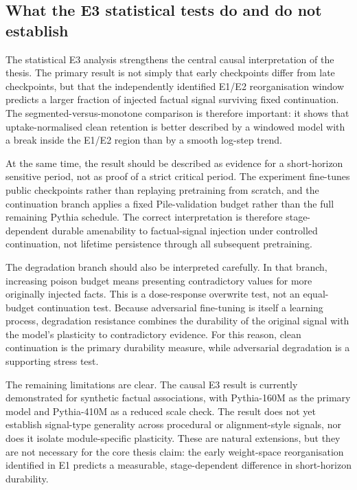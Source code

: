 \subsection{What the E3 statistical tests do and do not establish}
\label{sec:e3-stat-discussion}

The statistical E3 analysis strengthens the central causal interpretation of the thesis.  The primary result is not simply that early checkpoints differ from late checkpoints, but that the independently identified E1/E2 reorganisation window predicts a larger fraction of injected factual signal surviving fixed continuation.  The segmented-versus-monotone comparison is therefore important: it shows that uptake-normalised clean retention is better described by a windowed model with a break inside the E1/E2 region than by a smooth log-step trend.

At the same time, the result should be described as evidence for a short-horizon sensitive period, not as proof of a strict critical period.  The experiment fine-tunes public checkpoints rather than replaying pretraining from scratch, and the continuation branch applies a fixed Pile-validation budget rather than the full remaining Pythia schedule.  The correct interpretation is therefore stage-dependent durable amenability to factual-signal injection under controlled continuation, not lifetime persistence through all subsequent pretraining.

The degradation branch should also be interpreted carefully.  In that branch, increasing poison budget means presenting contradictory values for more originally injected facts.  This is a dose-response overwrite test, not an equal-budget continuation test.  Because adversarial fine-tuning is itself a learning process, degradation resistance combines the durability of the original signal with the model's plasticity to contradictory evidence.  For this reason, clean continuation is the primary durability measure, while adversarial degradation is a supporting stress test.

The remaining limitations are clear.  The causal E3 result is currently demonstrated for synthetic factual associations, with Pythia-160M as the primary model and Pythia-410M as a reduced scale check.  The result does not yet establish signal-type generality across procedural or alignment-style signals, nor does it isolate module-specific plasticity.  These are natural extensions, but they are not necessary for the core thesis claim: the early weight-space reorganisation identified in E1 predicts a measurable, stage-dependent difference in short-horizon durability.
